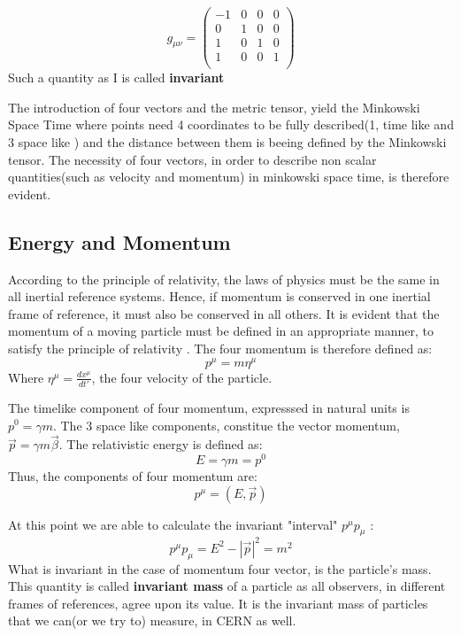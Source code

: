 \begin{equation}
g_{\mu \nu} = \begin{pmatrix}
-1 & 0 & 0 & 0\\
0 & 1 & 0 & 0\\
1 & 0 & 1 & 0\\
1 & 0 & 0 & 1\\
\end{pmatrix}
\end{equation}
Such a quantity as I is called \textbf{invariant}

The introduction of four vectors and the metric tensor, yield the Minkowski Space Time where points need 4 coordinates to be fully described(1, time like and 3 space like ) and the distance between them is beeing defined by the Minkowski tensor. The necessity of four vectors, in order to describe non scalar quantities(such as velocity and momentum) in minkowski space time, is therefore evident.

\subsection{Energy and Momentum}
\label{sec:org15fe0da}

According to the principle of relativity, the laws of physics must be the same in all inertial reference systems. Hence, if momentum is conserved  in one inertial frame of reference, it must also be conserved in all others. It is evident that the momentum of a moving particle must be defined in an appropriate manner, to satisfy the principle of relativity \cite{gParticles}. The four momentum is therefore defined as:
\begin{equation}
p^{\mu} = m\eta^{\mu}
\end{equation}
Where \(\eta^{\mu} = \frac{dx^{\mu}}{dt'}\), the four velocity of the particle.

The timelike component of four momentum, expresssed in natural units  is \(p^{0} = \gamma m\). The 3 space like components, constitue the vector momentum, \(\vec{p} = \gamma m\vec{\beta}\).
The relativistic energy is defined as:
\begin{equation}
E = \gamma m = p^{0}
\end{equation}
Thus, the components of four momentum are:
\begin{equation}
p^{\mu} = (E, \vec{p})
\end{equation}

At this point we are able to calculate the invariant "interval" \(p^{\mu}p_{\mu}\) :
\begin{equation}
p^{\mu}p_{\mu} = E^{2} - |\vec{p}|^{2} = m^{2}
\end{equation}
What is invariant in the case of momentum four vector, is the particle's mass. This quantity is called \textbf{invariant mass} of a particle as all observers, in different frames of references, agree upon its value. It is the invariant mass of particles that we can(or we try to) measure, in CERN as well. 

